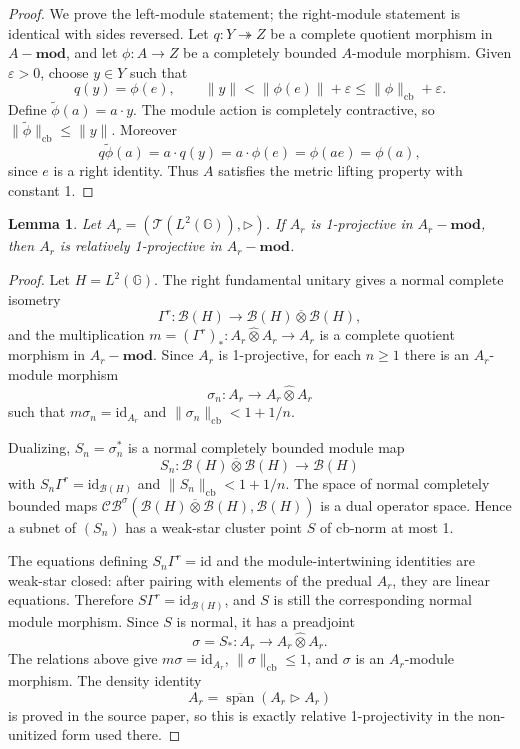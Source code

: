 \documentclass[11pt]{amsart}
\newtheorem{lemma}{Lemma}
\theoremstyle{remark}
\newcommand{\G}{\mathbb G}
\newcommand{\TC}{\mathcal T}
\newcommand{\B}{\mathcal B}
\newcommand{\cb}{\mathrm{cb}}
\newcommand{\id}{\mathrm{id}}
\newcommand{\opmod}{\mathbf{mod}}
\newcommand{\hot}{\widehat{\otimes}}
\newcommand{\vnot}{\overline{\otimes}}
\newcommand{\rhdp}{\triangleright}
\begin{document}
\begin{proof}
We prove the left-module statement; the right-module statement is identical with sides reversed.  Let \(q:Y\twoheadrightarrow Z\) be a complete quotient morphism in \(A-\opmod\), and let \(\phi:A\to Z\) be a completely bounded \(A\)-module morphism.  Given \(\varepsilon>0\), choose \(y\in Y\) such that
\[
 q(y)=\phi(e),\qquad \|y\|<\|\phi(e)\|+\varepsilon\leq \|\phi\|_{\cb}+\varepsilon.
\]
Define \(\widetilde\phi(a)=a\cdot y\).  The module action is completely contractive, so \(\|\widetilde\phi\|_{\cb}\leq\|y\|\).  Moreover
\[
 q\widetilde\phi(a)=a\cdot q(y)=a\cdot\phi(e)=\phi(ae)=\phi(a),
\]
since \(e\) is a right identity.  Thus \(A\) satisfies the metric lifting property with constant 1.
\end{proof}

\begin{lemma}\label{l:projective-relative}
Let \(A_r=(\TC(L^2(\G)),\rhdp)\).  If \(A_r\) is 1-projective in \(A_r-\opmod\), then \(A_r\) is relatively 1-projective in \(A_r-\opmod\).
\end{lemma}

\begin{proof}
Let \(H=L^2(\G)\).  The right fundamental unitary gives a normal complete isometry
\[
 \Gamma^r:\B(H)\to \B(H)\vnot\B(H),
\]
and the multiplication \(m=(\Gamma^r)_*:A_r\hot A_r\to A_r\) is a complete quotient morphism in \(A_r-\opmod\).  Since \(A_r\) is 1-projective, for each \(n\geq1\) there is an \(A_r\)-module morphism
\[
 \sigma_n:A_r\to A_r\hot A_r
\]
such that \(m\sigma_n=\id_{A_r}\) and \(\|\sigma_n\|_{\cb}<1+1/n\).

Dualizing, \(S_n=\sigma_n^*\) is a normal completely bounded module map
\[
 S_n:\B(H)\vnot\B(H)\to \B(H)
\]
with \(S_n\Gamma^r=\id_{\B(H)}\) and \(\|S_n\|_{\cb}<1+1/n\).  The space of normal completely bounded maps \(\mathcal{CB}^{\sigma}(\B(H)\vnot\B(H),\B(H))\) is a dual operator space.  Hence a subnet of \((S_n)\) has a weak-star cluster point \(S\) of cb-norm at most 1.

The equations defining \(S_n\Gamma^r=\id\) and the module-intertwining identities are weak-star closed: after pairing with elements of the predual \(A_r\), they are linear equations.  Therefore \(S\Gamma^r=\id_{\B(H)}\), and \(S\) is still the corresponding normal module morphism.  Since \(S\) is normal, it has a preadjoint
\[
 \sigma=S_*:A_r\to A_r\hot A_r.
\]
The relations above give \(m\sigma=\id_{A_r}\), \(\|\sigma\|_{\cb}\leq1\), and \(\sigma\) is an \(A_r\)-module morphism.  The density identity
\[
 A_r=\overline{\operatorname{span}}(A_r\rhdp A_r)
\]
is proved in the source paper, so this is exactly relative 1-projectivity in the non-unitized form used there.
\end{proof}
\end{document}
